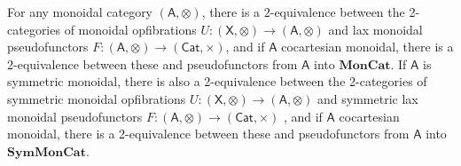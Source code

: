 \documentclass[ a4paper, onecolumn, superscriptaddress,10pt, accepted=2022-02-14, issue=3, volume=4, shorttitle=papers/compositionality-4-3 ]{compositionalityarticle}
\let\maps\colon
\newcommand{\A}{\mathsf{A}}
\newcommand{\X}{\mathsf{X}}
\newcommand{\bicat}{\mathbf}
\newcommand{\MonCat}{\bicat{MonCat}}
\newcommand{\SMC}{\bicat{SymMonCat}}
\begin{document}
\begin{lem}
\label{lem:MonGroth}
For any monoidal category $(\A,\otimes)$, there is a 2-equivalence between the 2-categories of monoidal opfibrations $U\maps (\X, \otimes) \to (\A,
\otimes)$ and lax monoidal pseudofunctors $F \maps (\A,\otimes) \to (\mathsf{Cat}, \times)$, and if $\A$ cocartesian monoidal, there is a
2-equivalence between these and pseudofunctors from $\A$ into $\MonCat$.  If $\A$ is symmetric monoidal, there is also a 2-equivalence between the
2-categories of symmetric monoidal opfibrations $U \maps (\X, \otimes) \to (\A, \otimes)$ and symmetric lax monoidal pseudofunctors $F \maps
(\A,\otimes) \to (\mathsf{Cat}, \times)$ , and if $\A$ cocartesian monoidal, there is a 2-equivalence between these and pseudofunctors from $\A$ into
$\SMC$.
\end{lem}
\end{document}
